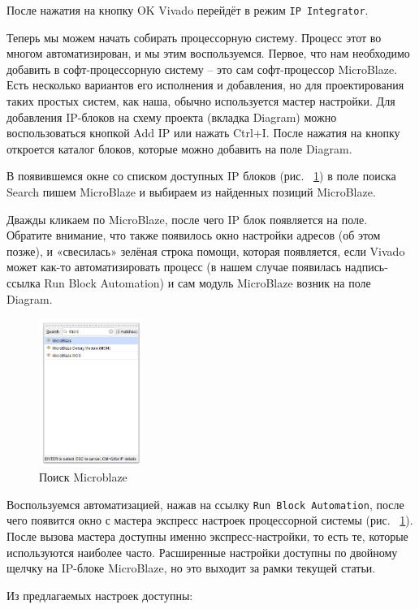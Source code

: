 \documentclass[a4paper,oneside ,14pt]{extreport}
\begin{document}
После нажатия на кнопку OK Vivado перейдёт в режим \verb|IP Integrator|.

Теперь мы можем начать собирать процессорную систему. Процесс этот во 
многом автоматизирован, и мы этим воспользуемся. Первое, что нам необходимо 
добавить в софт-процессорную систему – это сам софт-процессор MicroBlaze. Есть 
несколько вариантов его исполнения и добавления, но для проектирования таких 
простых систем, как наша, обычно используется мастер настройки. Для добавления 
IP-блоков на схему проекта (вкладка Diagram) можно воспользоваться кнопкой
Add IP или нажать Ctrl+I. После нажатия на кнопку откроется каталог блоков, которые можно 
добавить на поле Diagram.

В появившемся окне со списком доступных IP блоков (рис. ~\ref{m_16}) в поле поиска 
Search пишем MicroBlaze и выбираем из найденных позиций MicroBlaze.

Дважды кликаем по MicroBlaze, после чего IP блок появляется на поле. 
Обратите внимание, что также появилось окно настройки адресов (об этом 
позже), и «свесилась» зелёная строка помощи, которая появляется, если Vivado
может как-то автоматизировать процесс (в нашем случае появилась надпись-ссылка
Run Block Automation) и сам модуль MicroBlaze возник на поле Diagram.

\begin{figure}[!ht]
	\centering
	\includegraphics[width=0.3\textwidth]{image/m_16.png}
	\caption{Поиск Microblaze}
	\label{m_16}
\end{figure}

Воспользуемся автоматизацией, нажав на ссылку \verb|Run Block Automation|, после чего появится окно с мастера экспресс настроек процессорной 
системы (рис. ~\ref{m_16}). После вызова мастера доступны именно экспресс-настройки, то 
есть те, которые используются наиболее часто. Расширенные настройки доступны
по двойному щелчку на IP-блоке MicroBlaze, но это выходит за рамки текущей 
статьи.

Из предлагаемых настроек доступны:
\end{document}
